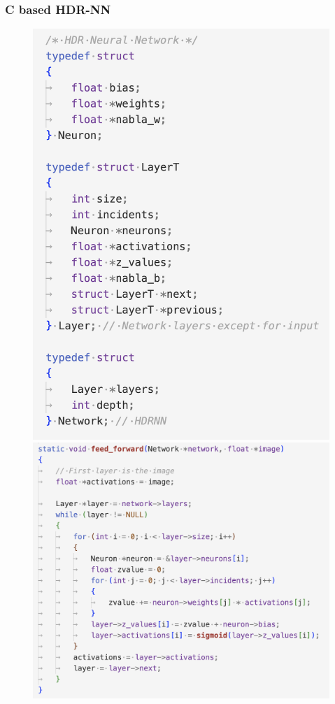 \documentclass{beamer}
\begin{document}
\begin{frame}
  \frametitle{C based HDR-NN}

  \begin{figure}
    \centering
    \includegraphics[scale=0.32]{images/c-hdrnn.png}
    \includegraphics[scale=0.28]{images/c-ff.png}
  \end{figure}

\end{frame}
\end{document}

